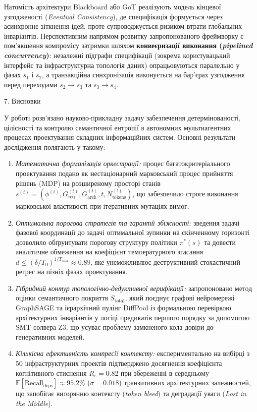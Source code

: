 \documentclass[12pt, reqno, a4paper]{amsart}
\theoremstyle{definition}
\theoremstyle{plain}
\theoremstyle{plain}
\theoremstyle{plain}
\theoremstyle{remark}
\theoremstyle{plain}
\begin{document}
{Натомість архітектури Blackboard \cite{bib18} або GoT \cite{bib10} реалізують модель кінцевої узгодженості (\textit{Eventual Consistency}), де специфікація формується через асинхронне зіткнення ідей, проте супроводжується ризиком втрати глобальних інваріантів. Перспективним напрямом розвитку запропонованого фреймворку є пом'якшення компромісу затримки шляхом \textbf{конвеєризації виконання (\textit{pipelined concurrency})}: незалежні підграфи специфікації (зокрема користувацький інтерфейс та інфраструктурна топологія даних) опрацьовуються паралельно у фазах $s_1$ і $s_2$, а транзакційна синхронізація виконується на бар'єрах узгодження перед переходами $s_2 \to s_3$ та $s_3 \to s_4$.

\begin{Head}
7. Висновки
\end{Head}

У роботі розв'язано науково-прикладну задачу забезпечення детермінованості, цілісності та контролю семантичної ентропії в автономних мультиагентних процесах проектування складних інформаційних систем. Основні результати дослідження полягають у такому:
\begin{enumerate}
\item \textit{Математична формалізація оркестрації:} процес багатокритеріального проектування подано як нестаціонарний марковський процес прийняття рішень (MDP) на розширеному просторі станів $s^{(t)} = (\phi^{(t)}, G_{\text{req}}^{(t)}, G_{\text{arch}}^{(t)}, t, N_{\text{tokens}}^{(t)})$, що забезпечило строге виконання марковської властивості при ітеративних мутаціях вимог.
\item \textit{Оптимальна порогова стратегія та гарантії збіжності:} зведення задачі фазової координації до задачі оптимальної зупинки на скінченному горизонті дозволило обґрунтувати порогову структуру політики $\pi^*(s)$ та довести аналітичне обмеження на коефіцієнт температурного згасання $d \le (\delta / T_0)^{1/T_{\max}} \approx 0.89$, яке унеможливлює деструктивний стохастичний регрес на пізніх фазах проектування.
\item \textit{Гібридний контур топологічно-дедуктивної верифікації:} запропоновано метод оцінки семантичного покриття $S_{\text{total}}$, який поєднує графові нейромережі GraphSAGE та ієрархічний пулінг DiffPool із формальною перевіркою архітектурних інваріантів у логіці предикатів першого порядку за допомогою SMT-солвера Z3, що усуває проблему замкненого кола довіри до генеративних моделей.
\item \textit{Кількісна ефективність компресії контексту:} експериментально на вибірці з $50$ інфраструктурних проектів підтверджено досягнення коефіцієнта когнітивного стиснення $R_{\text{c}} = 0.82$ при збереженні в середньому $\mathbb{E}[\text{Recall}_{\text{deps}}] \approx 95.2\%$ ($\sigma = 0.018$) транзитивних архітектурних залежностей, що запобігає вигорянню контексту (\textit{token bleed}) та деградації уваги (\textit{Lost in the Middle}).
\end{enumerate}

}
\end{document}
